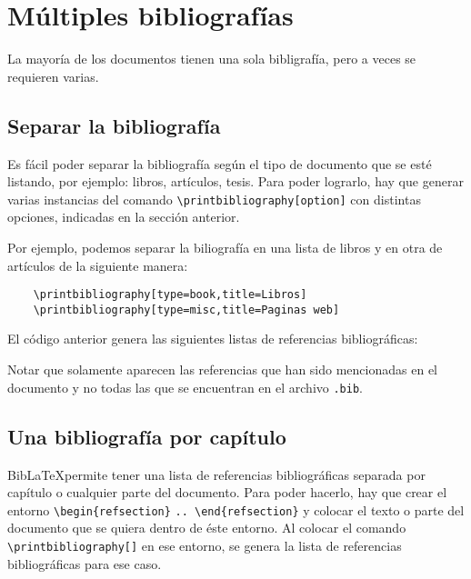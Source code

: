 \section{Múltiples bibliografías}

La mayoría de los documentos tienen una sola bibligrafía, pero a veces se requieren varias. 

\subsection{Separar la bibliografía}

Es fácil poder separar la bibliografía según el tipo de documento que se esté listando, por ejemplo: libros, artículos, tesis. Para poder lograrlo, hay que generar varias instancias del comando \verb|\printbibliography[option]| con distintas opciones, indicadas en la sección anterior. 

Por ejemplo, podemos separar la biliografía en una lista de libros y en otra de artículos de la siguiente manera:
\begin{lstlisting}
	\printbibliography[type=book,title=Libros]
	\printbibliography[type=misc,title=Paginas web]
\end{lstlisting}

El código anterior genera las siguientes listas de referencias bibliográficas:
\printbibliography[type=book,title=Libros]
\printbibliography[type=misc,title=Páginas web]

Notar que solamente aparecen las referencias que han sido mencionadas en el documento y no todas las que se encuentran en el archivo \verb|.bib|.

\subsection{Una bibliografía por capítulo}
Bib\LaTeX permite tener una lista de referencias bibliográficas separada por capítulo o cualquier parte del documento. Para poder hacerlo, hay que crear el entorno \verb|\begin{refsection}| \verb|.. \end{refsection}| y colocar el texto o parte del documento que se quiera dentro de éste entorno. Al colocar el comando \verb|\printbibliography[]| en ese entorno, se genera la lista de referencias bibliográficas para ese caso. \\


